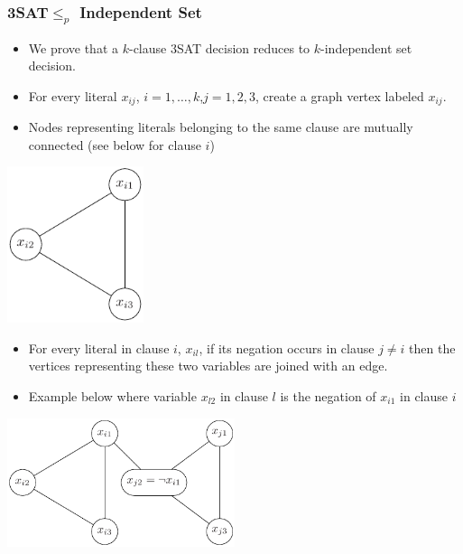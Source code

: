 \documentclass{beamer}
\begin{document}
\begin{frame}
  \frametitle{3SAT$\le_p$ Independent Set}
  \begin{itemize}
  \item We prove that a $k$-clause 3SAT decision reduces to $k$-independent set decision.
\item For every literal $x_{ij}$, $i=1,\ldots,k$,$j=1,2,3$, create a graph vertex labeled $x_{ij}$.
\item Nodes representing literals belonging to the same clause are mutually connected (see below for clause $i$)
  \end{itemize}
\includegraphics[width=0.3\textwidth]{np-figs/3SAT-to-IS}
\end{frame}
\begin{frame}
  \begin{itemize}
  \item For every literal in clause $i$, $x_{il}$, if its negation occurs in clause $j\ne i$ then the vertices representing these two variables are joined with an edge.
\item Example below where variable $x_{l2}$ in clause $l$ is the negation of $x_{i1}$ in clause $i$
  \end{itemize}
\includegraphics[width=0.5\textwidth]{np-figs/3SAT-to-IS-negation}
\end{frame}
\end{document}
